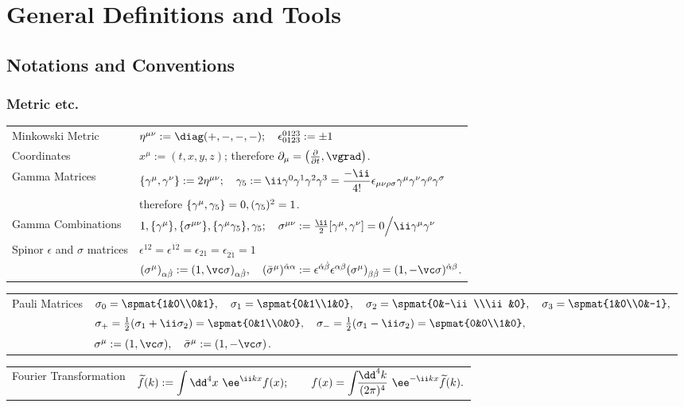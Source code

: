 
\section{General Definitions and Tools}
\subsection{Notations and Conventions}
\subsubsection{Metric etc.}
\begin{tabular}{l@{ :\ \ \ }l}
Minkowski Metric   & $\Hmn := \diag(+,-,-,-);\quad\epsilon_{0123}^{0123}:=\pm1$\\
Coordinates        & $\displaystyle x^\mu := (t,x,y,z)$; \quad therefore $\Pm = \left(\tfrac{\partial}{\partial t},\vgrad\right)$.\\
Gamma Matrices     & $\{\Gm,\Gn\}:=2\Hmn;\quad \G5:=\ii\G0\G1\G2\G3=
                      \dfrac{-\ii}{4!}\epsilon_{\mu\nu\rho\sigma}\Gm\Gn\Gr\Gs$\\
                   & therefore $\{\Gm,\G5\}=0,(\G5)^2=1$.\\[1zw]
Gamma Combinations & $1, \{\Gm\}, \{\sigma^{\mu\nu}\}, \{\Gm\G5\}, \G5;\quad
                      \sigma^{\mu\nu}:=\frac\ii2[\Gm,\Gn]=0\Big/\ii\Gm\Gn$\\
Spinor $\epsilon$ and $\sigma$ matrices
                   &$\epsilon^{12}=\epsilon^{\dot1\dot2}=\epsilon_{21}=\epsilon_{\dot2\dot1}=1$\\
& $(\Sm)_{\alpha\dbeta} := (1,\vc\sigma)_{\alpha\dbeta},\quad
 (\bSm)^{\dalpha\alpha} :=\epsilon^{\dalpha\dbeta}\epsilon^{\alpha\beta}(\Sm)_{\beta\dbeta}
 =(1,-\vc\sigma)^{\dalpha\beta}$.\\
\end{tabular}
\begin{rightnote}
\begin{tabular}{l@{ :\ \ \ }l}
 Pauli Matrices & $
\sigma_0 = \spmat{1&0\\0&1},\quad
\sigma_1 = \spmat{0&1\\1&0},\quad
\sigma_2 = \spmat{0&-\ii\\\ii&0},\quad
\sigma_3 = \spmat{1&0\\0&-1},$\\
 & $\sigma_+ = \tfrac12(\sigma_1+\ii\sigma_2) = \spmat{0&1\\0&0},\quad
    \sigma_- = \tfrac12(\sigma_1-\ii\sigma_2) = \spmat{0&0\\1&0},$\\[.5zw]
 & $\Sm:=(1,\vc\sigma),\quad \bSm:=(1,-\vc\sigma)$.
\end{tabular}\vspace{-.5zw}
\end{rightnote}
\begin{tabular}{l@{ :\ \ \ }l}
Fourier Transformation & 
$\displaystyle
 \tilde f(k) := \int\dd^4x\ \ee^{\ii kx}f(x); \qquad
        f(x) = \intdP[4]{k}\ \ee^{-\ii kx}\tilde f(k).$
\end{tabular}

